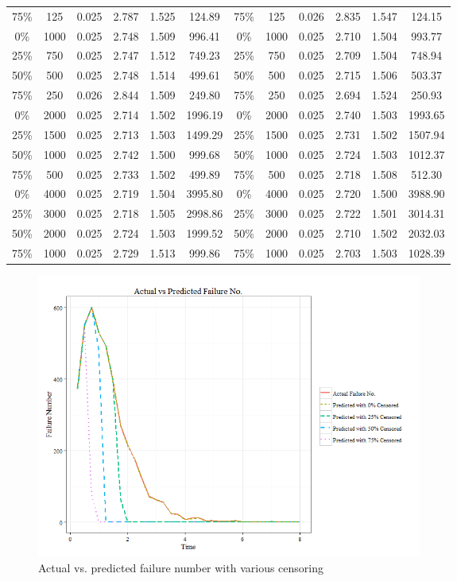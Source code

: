 \documentclass[12pt,letterpaper]{article}
\begin{document}
\begin{table}[htbp]
\begin{tabular}{cccccc||cccccc}
				75\%  & 125   & 0.025 & 2.787 & 1.525 & 124.89 & 75\%  & 125 & 0.026 & 2.835 & 1.547 & 124.15 \\
				0\%   & 1000  & 0.025 & 2.748 & 1.509 & 996.41 & 0\%   & 1000 & 0.025 & 2.710 & 1.504 & 993.77 \\
				25\%  & 750   & 0.025 & 2.747 & 1.512 & 749.23 & 25\%  & 750 & 0.025 & 2.709 & 1.504 & 748.94 \\
				50\%  & 500   & 0.025 & 2.748 & 1.514 & 499.61 & 50\%  & 500 & 0.025 & 2.715 & 1.506 & 503.37 \\
				75\%  & 250   & 0.026 & 2.844 & 1.509 & 249.80 & 75\%  & 250 & 0.025 & 2.694 & 1.524 & 250.93 \\
				0\%   & 2000  & 0.025 & 2.714 & 1.502 & 1996.19 & 0\%   & 2000 & 0.025 & 2.740 & 1.503 & 1993.65 \\
				25\%  & 1500  & 0.025 & 2.713 & 1.503 & 1499.29 & 25\%  & 1500 & 0.025 & 2.731 & 1.502 & 1507.94 \\
				50\%  & 1000  & 0.025 & 2.742 & 1.500 & 999.68 & 50\%  & 1000  & 0.025 & 2.724 & 1.503 & 1012.37 \\
				75\%  & 500   & 0.025 & 2.733 & 1.502 & 499.89 & 75\%  & 500 & 0.025 & 2.718 & 1.508 & 512.30 \\
				0\%   & 4000  & 0.025 & 2.719 & 1.504 & 3995.80 & 0\%   & 4000 & 0.025 & 2.720 & 1.500 & 3988.90 \\
				25\%  & 3000  & 0.025 & 2.718 & 1.505 & 2998.86 & 25\%  & 3000 & 0.025 & 2.722 & 1.501 & 3014.31 \\
				50\%  & 2000  & 0.025 & 2.724 & 1.503 & 1999.52 & 50\%  & 2000 & 0.025 & 2.710 & 1.502 & 2032.03 \\
				75\%  & 1000  & 0.025 & 2.729 & 1.513 & 999.86 & 75\%  & 1000 & 0.025 & 2.703 & 1.503 & 1028.39 \\
				\bottomrule
	\end{tabular}%
	\label{tab:rightcensor}%
\end{table}%
\begin{figure}[htbp]
		\centering
		\includegraphics[width=5in]{Fig7-1}
		\caption{Actual vs. predicted failure number with various censoring}
		\label{fig:7}
\end{figure}
\end{document}
